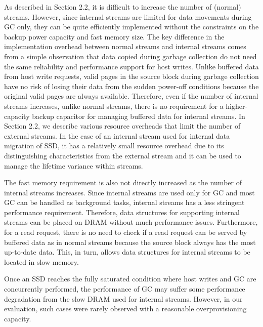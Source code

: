 {\color{blue}
As described in Section 2.2, it is difficult to increase the number of 
(normal) streams.  However, since internal streams are limited for 
data movements during GC only, they can be quite efficiently
implemented without the constraints on the backup power capacity and fast memory size.  
The key difference in the implementation overhead between normal streams and 
internal streams comes from a simple observation that data copied during 
garbage collection do not need the same reliability and performance support for host writes.  
Unlike buffered data from host write requests, valid pages in
the source block during garbage collection have no risk of losing their data 
from the sudden power-off conditions because the original valid pages are always available.    
Therefore, even if the
number of internal streams increases, unlike normal streams, there is no requirement 
for a higher-capacity backup capacitor for managing buffered data for internal streams. 
In Section 2.2, we describe various resource overheads that limit the number of external streams.
In the case of an internal stream used for internal data migration of SSD, 
it has a relatively small resource overhead due to its distinguishing characteristics from the external stream
and it can be used to manage the lifetime variance within streams.

The fast memory requirement is also not directly increased as the number 
of internal streams increases.   
Since internal streams are used only for GC and most GC can be handled as background tasks,
internal streams has a less stringent performance requirement.  
Therefore, data structures for supporting internal streams can be placed 
on DRAM without much performance issues.  
Furthermore, for a read request, there is no need to check if a read request 
can be served by buffered data as in normal streams because the source block always 
has the most up-to-date data.  
This, in turn, allows data structures for internal streams to be located in slow memory.

Once an SSD reaches the fully saturated condition where host writes and GC 
are concurrently performed, the performance of GC may suffer some performance degradation 
from the slow DRAM used for internal streams.   
However, in our evaluation, such cases were rarely observed with a reasonable overprovisioning capacity.
}

